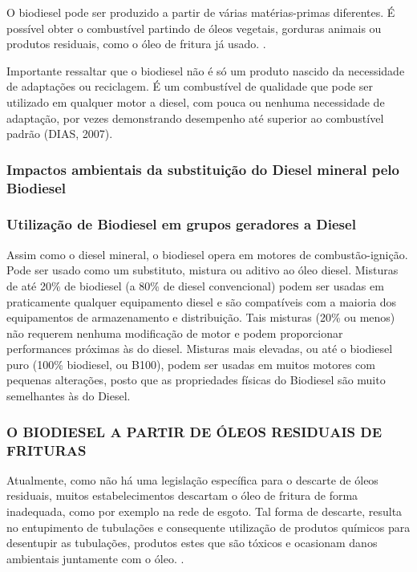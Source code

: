     O biodiesel pode ser produzido a partir de várias matérias-primas diferentes. É possível obter o combustível partindo de óleos vegetais, gorduras animais ou produtos residuais, como o óleo de fritura já usado. \cite{biodieselbr}.
    
    Importante ressaltar que o biodiesel não é só um produto nascido da necessidade de adaptações ou reciclagem. É um combustível de qualidade que pode ser utilizado em qualquer motor a diesel, com pouca ou nenhuma necessidade de adaptação, por vezes demonstrando desempenho até superior ao combustível padrão (DIAS, 2007).
    
\subsubsection{Impactos ambientais da substituição do Diesel mineral pelo Biodiesel}
    
\subsubsection{Utilização de Biodiesel em grupos geradores a Diesel}

\hspace{0.8cm}Assim como o diesel mineral, o biodiesel opera em motores de combustão-ignição. Pode ser usado como um substituto, mistura ou aditivo ao óleo diesel. Misturas de até 20\% de biodiesel (a 80\% de diesel convencional) podem ser usadas em praticamente qualquer equipamento diesel e são compatíveis com a maioria dos equipamentos de armazenamento e distribuição. Tais misturas (20\% ou menos) não requerem nenhuma modificação de motor e podem proporcionar performances próximas às do diesel. Misturas mais elevadas, ou até o biodiesel puro (100\% biodiesel, ou B100), podem ser usadas em muitos motores com pequenas alterações, posto que as propriedades físicas do Biodiesel são muito semelhantes às do Diesel. \cite{udaeta}

\subsubsection{O BIODIESEL A PARTIR DE ÓLEOS RESIDUAIS DE FRITURAS}

\hspace*{0.8cm}Atualmente, como não há uma legislação específica para o descarte de óleos residuais, muitos estabelecimentos descartam o óleo de fritura de forma inadequada, como por exemplo na rede de esgoto. Tal forma de descarte, resulta no entupimento de tubulações e consequente utilização de produtos químicos para desentupir as tubulações, produtos estes que são tóxicos e ocasionam danos ambientais juntamente com o óleo. \cite{bumba}.

